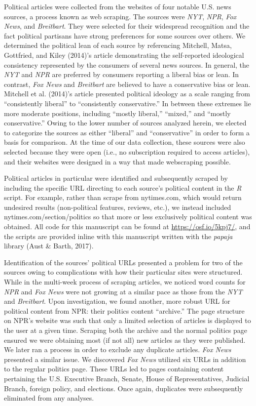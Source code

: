 \documentclass[
  man,floatsintext]{apa6}
\begin{document}
Political articles were collected from the websites of four notable U.S. news sources, a process known as web scraping. The sources were \emph{NYT}, \emph{NPR}, \emph{Fox News}, and \emph{Breitbart}. They were selected for their widespread recognition and the fact political partisans have strong preferences for some sources over others. We determined the political lean of each source by referencing Mitchell, Matsa, Gottfried, and Kiley (2014)'s article demonstrating the self-reported ideological consistency represented by the consumers of several news sources. In general, the \emph{NYT} and \emph{NPR} are preferred by consumers reporting a liberal bias or lean. In contrast, \emph{Fox News} and \emph{Breitbart} are believed to have a conservative bias or lean. Mitchell et al. (2014)'s article presented political ideology as a scale ranging from ``consistently liberal'' to ``consistently conservative.'' In between these extremes lie more moderate positions, including ``mostly liberal,'' ``mixed,'' and ``mostly conservative.'' Owing to the lower number of sources analyzed herein, we elected to categorize the sources as either ``liberal'' and ``conservative'' in order to form a basis for comparison. At the time of our data collection, these sources were also selected because they were open (i.e., no subscription required to access articles), and their websites were designed in a way that made webscraping possible.

Political articles in particular were identified and subsequently scraped by including the specific URL directing to each source's political content in the \emph{R} script. For example, rather than scrape from nytimes.com, which would return undesired results (non-political features, reviews, etc.), we instead included nytimes.com/section/politics so that more or less exclusively political content was obtained. All code for this manuscript can be found at \url{https://osf.io/5kpj7/}, and the scripts are provided inline with this manuscript written with the \emph{papaja} library (Aust \& Barth, 2017).

Identification of the sources' political URLs presented a problem for two of the sources owing to complications with how their particular sites were structured. While in the multi-week process of scraping articles, we noticed word counts for \emph{NPR} and \emph{Fox News} were not growing at a similar pace as those from the \emph{NYT} and \emph{Breitbart}. Upon investigation, we found another, more robust URL for political content from NPR: their politics content ``archive.'' The page structure on NPR's website was such that only a limited selection of articles is displayed to the user at a given time. Scraping both the archive and the normal politics page ensured we were obtaining most (if not all) new articles as they were published. We later ran a process in order to exclude any duplicate articles. \emph{Fox News} presented a similar issue. We discovered \emph{Fox News} utilized six URLs in addition to the regular politics page. These URLs led to pages containing content pertaining the U.S. Executive Branch, Senate, House of Representatives, Judicial Branch, foreign policy, and elections. Once again, duplicates were subsequently eliminated from any analyses.
\end{document}
